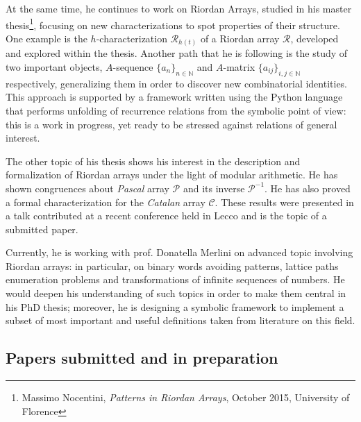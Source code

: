 \documentclass[10pt,a4paper]{scrartcl}
\begin{document}
    At the same time, he continues to work on Riordan Arrays, studied in his
    master thesis\footnote{Massimo Nocentini, \textit{Patterns in Riordan Arrays}, October 2015, University of Florence}, 
    focusing on new characterizations to spot properties of their
    structure. One example is the $h$-characterization $\mathcal{R}_{h(t)}$ of a
    Riordan array $\mathcal{R}$, developed and explored within the thesis.
    Another path that he is following is the study of two important objects, $A$-sequence
    $\lbrace a_{n}\rbrace_{n\in\mathbb{N}}$ and $A$-matrix $\lbrace
    a_{ij}\rbrace_{i,j\in\mathbb{N}}$ respectively, generalizing them in order to
    discover new combinatorial identities. This approach is supported by a framework
    written using the Python language that performs unfolding of recurrence relations
    from the symbolic point of view: this is a work in progress, yet ready
    to be stressed against relations of general interest.


    The other topic of his thesis shows his interest in the description and formalization of Riordan
    arrays under the light of modular arithmetic. He has shown congruences
    about \emph{Pascal} array $\mathcal{P}$ and its inverse $\mathcal{P}^{-1}$. He
    has also proved a formal characterization for the \emph{Catalan} array
    $\mathcal{C}$. These results were presented in a talk contributed at a recent
    conference held in Lecco and is the topic of a submitted paper.

    Currently, he is working with prof. Donatella Merlini
    on advanced topic involving Riordan arrays: in particular, on binary words avoiding patterns, 
    lattice paths enumeration problems and transformations of infinite sequences of numbers.
    He would deepen his understanding of such topics in order to make them central in his PhD thesis;
    moreover, he is designing a symbolic framework to implement a subset of most important and useful
    definitions taken from literature on this field.

    \subsection{Papers submitted and in preparation}
\end{document}
